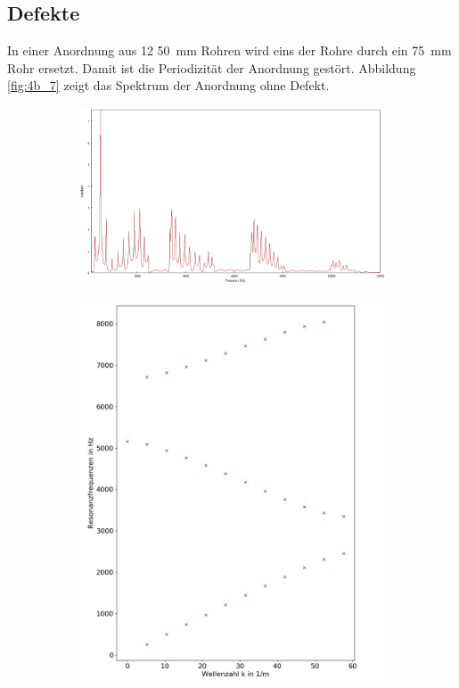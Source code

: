 \subsection{Defekte}
\label{sec:Defekte}
In einer Anordnung aus 12 50~mm Rohren wird eins der Rohre durch ein 75~mm Rohr ersetzt. 
Damit ist die Periodizität der Anordnung gestört.
Abbildung \ref{fig:4b_7} zeigt das Spektrum der Anordnung ohne Defekt.
\begin{figure}
\centering
\begin{subfigure}{0.65\textwidth}
\includegraphics[width=\textwidth]{content/messungen/Chapter4b/4b_7_12x50.jpg}
\end{subfigure}
\begin{subfigure}{0.34\textwidth}
\includegraphics[width=\textwidth]{content/Scripts/4b_7_red.jpg}

\end{subfigure}
\end{figure}
